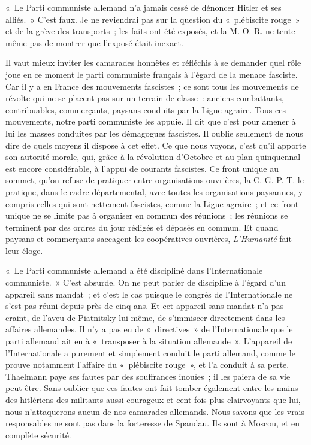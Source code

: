 \documentclass[french,twoside]{book} %
\begin{document}
« Le Parti communiste allemand n'a jamais cessé de dénoncer Hitler et ses alliés. » C'est faux. Je ne reviendrai pas sur la question du « plébiscite rouge » et de la grève des transports ; les faits ont été exposés, et la M. O. R. ne tente même pas de montrer que l'exposé était inexact.\par
Il vaut mieux inviter les camarades honnêtes et réfléchis à se demander quel rôle joue en ce moment le parti communiste français à l'égard de la menace fasciste. Car il y a en France des mouvements fascistes ; ce sont tous les mouvements de révolte qui ne se placent pas sur un terrain de classe : anciens combattants, contribuables, commerçants, paysans conduits par la Ligue agraire. Tous ces mouvements, notre parti communiste les appuie. Il dit que c'est pour amener à lui les masses conduites par les démagogues fascistes. Il oublie seulement de nous dire de quels moyens il dispose à cet effet. Ce que nous voyons, c'est qu'il apporte son autorité morale, qui, grâce à la révolution d'Octobre et au plan quinquennal est encore considérable, à l'appui de courants fascistes. Ce front unique au sommet, qu'on refuse de pratiquer entre organisations ouvrières, la C. G. P. T. le pratique, dans le cadre départemental, avec toutes les organisations paysannes, y compris celles qui sont nettement fascistes, comme la Ligue agraire ; et ce front unique ne se limite pas à organiser en commun des réunions ; les réunions se terminent par des ordres du jour rédigés et déposés en commun. Et quand paysans et commerçants saccagent les coopératives ouvrières, {\itshape L'Humanité} fait leur éloge.\par
« Le Parti communiste allemand a été discipliné dans l'Internationale communiste. » C'est absurde. On ne peut parler de discipline à l'égard d'un appareil sans mandat ; et c'est le cas puisque le congrès de l'Internationale ne s'est pas réuni depuis près de cinq ans. Et cet appareil sans mandat n'a pas craint, de l'aveu de Piatnitsky lui-même, de s'immiscer directement dans les affaires allemandes. Il n'y a pas eu de « directives » de l'Internationale que le parti allemand ait eu à « transposer à la situation allemande ». L'appareil de l'Internationale a purement et simplement conduit le parti allemand, comme le prouve notamment l'affaire du « plébiscite rouge », et l'a conduit à sa perte. Thaelmann paye ses fautes par des souffrances inouïes ; il les paiera de sa vie peut-être. Sans oublier que ces fautes ont fait tomber également entre les mains des hitlériens des militants aussi courageux et cent fois plus clair­voyants que lui, nous n'attaquerons aucun de nos camarades allemands. Nous savons que les vrais responsables ne sont pas dans la forteresse de Spandau. Ils sont à Moscou, et en complète sécurité.\par
\end{document}
